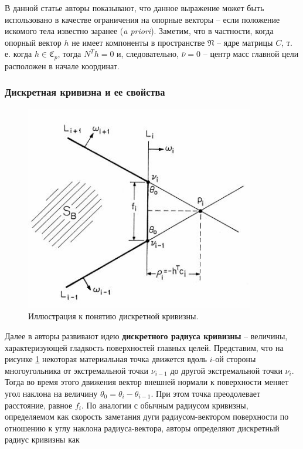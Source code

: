 \documentclass[a4paper, 12pt, titlepage]{article}
\theoremstyle{definition}
\theoremstyle{plain}
\begin{document}
В данной статье авторы показывают, что данное выражение может быть использовано
в качестве ограничения на опорные векторы -- если положение искомого тела
известно заранее (\textit{a priori}). Заметим, что в частности, когда опорный
вектор $h$ не имеет компоненты в пространстве $\mathfrak{N}$ -- ядре матрицы
$C$, т. е. когда $h \in \mathfrak{C}_{p}$, тогда $N^{T} h = 0$ и, следовательно,
$\overline{\nu} = 0$ -- центр масс главной цели расположен в начале координат.

\subsubsection{Дискретная кривизна и ее свойства}
\label{sec:history/PrinceW90/discrete-curvature}

\begin{figure}[ht]
    \includegraphics[width=10cm]{images/dicrete-radius-curvature.jpg}
    \caption{Иллюстрация к понятию дискретной кривизны.}
    \label{dicrete-radius-curvature}
\end{figure}

Далее в авторы развивают идею \textbf{дискретного радиуса кривизны} -- величины,
характеризующей гладкость поверхностей главных целей. Представим, что на
рисунке \ref{dicrete-radius-curvature} некоторая материальная точка движется
вдоль $i$-ой стороны многоугольника от экстремальной точки $\nu_{i - 1}$ до
другой экстремальной точки $\nu_{i}$. Тогда во время этого движения вектор
внешней нормали к поверхности меняет угол наклона на величину
$\theta_{0} = \theta_{i} - \theta_{i - 1}$. При этом точка преодолевает
расстояние, равное $f_{i}$. По аналогии с обычным радиусом кривизны,
определяемом как скорость заметания дуги радиусом-вектором поверхности по
отношению к углу наклона радиуса-вектора, авторы определяют дискретный радиус
кривизны как
\end{document}
